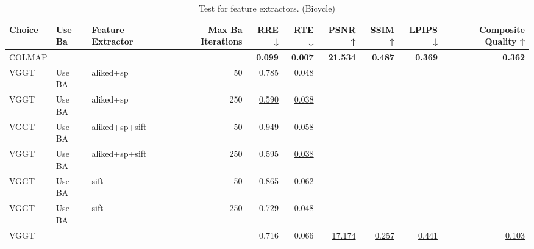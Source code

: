 \begin{table}[H]
\caption{Test for feature extractors. (Bicycle)}
\label{tab:99_feature_extractor_bicycle}
\small
\begin{tabular}{lllrrrrrrr}
\toprule
Choice & Use Ba & Feature Extractor & Max Ba Iterations & RRE ↓ & RTE ↓ & PSNR ↑ & SSIM ↑ & LPIPS ↓ & Composite Quality ↑ \\
\midrule
COLMAP &  &  &  & \textbf{0.099} & \textbf{0.007} & \textbf{21.534} & \textbf{0.487} & \textbf{0.369} & \textbf{0.362} \\
VGGT & Use BA & aliked+sp & 50 & 0.785 & 0.048 &  &  &  &  \\
VGGT & Use BA & aliked+sp & 250 & \underline{0.590} & \underline{0.038} &  &  &  &  \\
VGGT & Use BA & aliked+sp+sift & 50 & 0.949 & 0.058 &  &  &  &  \\
VGGT & Use BA & aliked+sp+sift & 250 & 0.595 & \underline{0.038} &  &  &  &  \\
VGGT & Use BA & sift & 50 & 0.865 & 0.062 &  &  &  &  \\
VGGT & Use BA & sift & 250 & 0.729 & 0.048 &  &  &  &  \\
VGGT &  &  &  & 0.716 & 0.066 & \underline{17.174} & \underline{0.257} & \underline{0.441} & \underline{0.103} \\
\bottomrule
\end{tabular}
\end{table}
